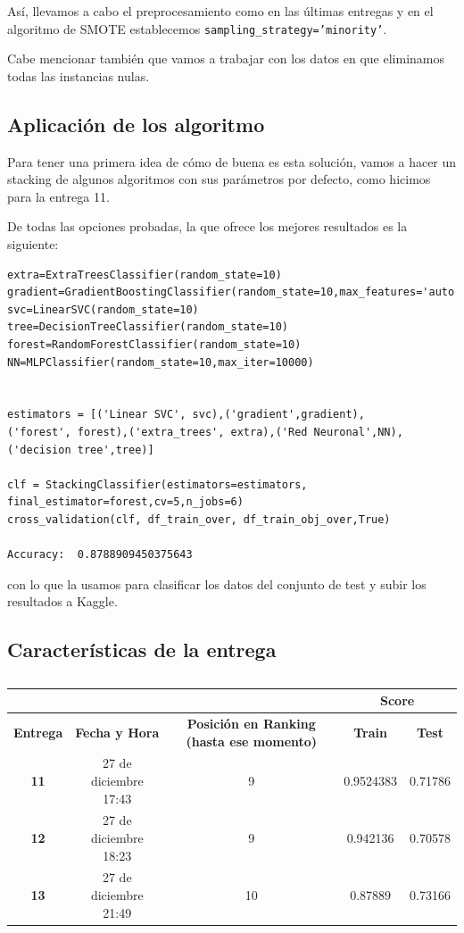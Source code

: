 \documentclass[a4paper,11pt]{article}
\begin{document}
Así, llevamos a cabo el preprocesamiento como en las últimas entregas y en el algoritmo de SMOTE establecemos \texttt{sampling_strategy='minority'}. 

Cabe mencionar también que vamos a trabajar con los datos en que eliminamos todas las instancias nulas.

\subsection{Aplicación de los algoritmo}

Para tener una primera idea de cómo de buena es esta solución, vamos a hacer un stacking de algunos algoritmos con sus parámetros por defecto, como hicimos para la entrega 11.

De todas las opciones probadas, la que ofrece los mejores resultados es la siguiente:
\begin{verbatim}
extra=ExtraTreesClassifier(random_state=10)
gradient=GradientBoostingClassifier(random_state=10,max_features='auto')
svc=LinearSVC(random_state=10)
tree=DecisionTreeClassifier(random_state=10)
forest=RandomForestClassifier(random_state=10)
NN=MLPClassifier(random_state=10,max_iter=10000)


estimators = [('Linear SVC', svc),('gradient',gradient),
('forest', forest),('extra_trees', extra),('Red Neuronal',NN),('decision tree',tree)]

clf = StackingClassifier(estimators=estimators, final_estimator=forest,cv=5,n_jobs=6)
cross_validation(clf, df_train_over, df_train_obj_over,True) 

Accuracy:  0.8788909450375643
\end{verbatim}

con lo que la usamos para clasificar los datos del conjunto de test y subir los resultados a Kaggle.

\subsection{Características de la entrega}

\begin{table}[htbp]
	\caption{}\begin{center}
	\begin{tabular}{|c|c|c|c|c|}
		\hline
		\multicolumn{1}{|l|}{\textbf{}} & \textbf{} & \textbf{} & \multicolumn{ 2}{c|}{\textbf{Score}} \\ \hline
		\textbf{Entrega} & \textbf{Fecha y Hora} & \textbf{Posición en Ranking (hasta ese momento)} & \textbf{Train} & \textbf{Test} \\ \hline
		\textbf{11} & 27 de diciembre  17:43 & 9 & 0.9524383 & 0.71786 \\ \hline
		\textbf{12} & 27 de diciembre 18:23 & 9 & 0.942136 & 0.70578 \\ \hline
		\textbf{13} & 27 de diciembre 21:49 & 10 & 0.87889 & 0.73166 \\ \hline
	\end{tabular}\end{center}
	\label{}
\end{table}
\end{document}
